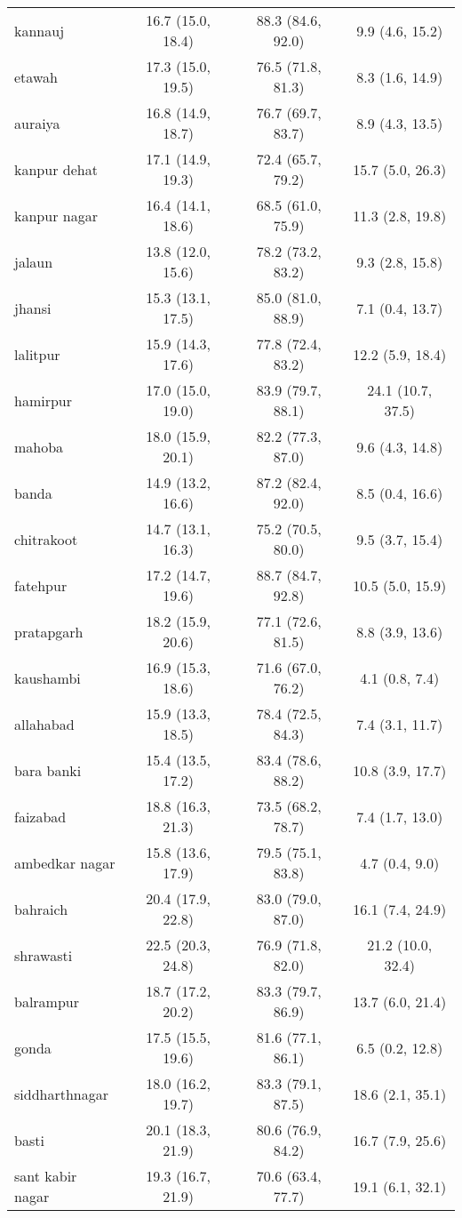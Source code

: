 \begin{tabular}{lccc}
kannauj&16.7 (15.0, 18.4)&88.3 (84.6, 92.0)&9.9 (4.6, 15.2)\\
etawah&17.3 (15.0, 19.5)&76.5 (71.8, 81.3)&8.3 (1.6, 14.9)\\
auraiya&16.8 (14.9, 18.7)&76.7 (69.7, 83.7)&8.9 (4.3, 13.5)\\
kanpur dehat&17.1 (14.9, 19.3)&72.4 (65.7, 79.2)&15.7 (5.0, 26.3)\\
kanpur nagar&16.4 (14.1, 18.6)&68.5 (61.0, 75.9)&11.3 (2.8, 19.8)\\
jalaun&13.8 (12.0, 15.6)&78.2 (73.2, 83.2)&9.3 (2.8, 15.8)\\
jhansi&15.3 (13.1, 17.5)&85.0 (81.0, 88.9)&7.1 (0.4, 13.7)\\
lalitpur&15.9 (14.3, 17.6)&77.8 (72.4, 83.2)&12.2 (5.9, 18.4)\\
hamirpur&17.0 (15.0, 19.0)&83.9 (79.7, 88.1)&24.1 (10.7, 37.5)\\
mahoba&18.0 (15.9, 20.1)&82.2 (77.3, 87.0)&9.6 (4.3, 14.8)\\
banda&14.9 (13.2, 16.6)&87.2 (82.4, 92.0)&8.5 (0.4, 16.6)\\
chitrakoot&14.7 (13.1, 16.3)&75.2 (70.5, 80.0)&9.5 (3.7, 15.4)\\
fatehpur&17.2 (14.7, 19.6)&88.7 (84.7, 92.8)&10.5 (5.0, 15.9)\\
pratapgarh&18.2 (15.9, 20.6)&77.1 (72.6, 81.5)&8.8 (3.9, 13.6)\\
kaushambi&16.9 (15.3, 18.6)&71.6 (67.0, 76.2)&4.1 (0.8, 7.4)\\
allahabad&15.9 (13.3, 18.5)&78.4 (72.5, 84.3)&7.4 (3.1, 11.7)\\
bara banki&15.4 (13.5, 17.2)&83.4 (78.6, 88.2)&10.8 (3.9, 17.7)\\
faizabad&18.8 (16.3, 21.3)&73.5 (68.2, 78.7)&7.4 (1.7, 13.0)\\
ambedkar nagar&15.8 (13.6, 17.9)&79.5 (75.1, 83.8)&4.7 (0.4, 9.0)\\
bahraich&20.4 (17.9, 22.8)&83.0 (79.0, 87.0)&16.1 (7.4, 24.9)\\
shrawasti&22.5 (20.3, 24.8)&76.9 (71.8, 82.0)&21.2 (10.0, 32.4)\\
balrampur&18.7 (17.2, 20.2)&83.3 (79.7, 86.9)&13.7 (6.0, 21.4)\\
gonda&17.5 (15.5, 19.6)&81.6 (77.1, 86.1)&6.5 (0.2, 12.8)\\
siddharthnagar&18.0 (16.2, 19.7)&83.3 (79.1, 87.5)&18.6 (2.1, 35.1)\\
basti&20.1 (18.3, 21.9)&80.6 (76.9, 84.2)&16.7 (7.9, 25.6)\\
sant kabir nagar&19.3 (16.7, 21.9)&70.6 (63.4, 77.7)&19.1 (6.1, 32.1)\\

\end{tabular}
